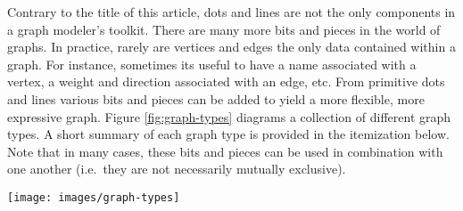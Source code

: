 \documentclass{svmult}
\begin{document}
Contrary to the title of this article, dots and lines are not the only components in a graph modeler's toolkit. There are many more bits and pieces in the world of graphs. In practice, rarely are vertices and edges the only data contained within a graph. For instance, sometimes its useful to have a name associated with a vertex, a weight and direction associated with an edge, etc. From primitive dots and lines various bits and pieces can be added to yield a more flexible, more expressive graph. Figure \ref{fig:graph-types} diagrams a collection of different graph types. A short summary of each graph type is provided in the itemization below. Note that in many cases, these bits and pieces can be used in combination with one another (i.e.~they are not necessarily mutually exclusive).
\begin{figure*}[h!]
	\centering
		\texttt{[image: images/graph-types]}
	\caption{\label{fig:graph-types}There are numerous types of graphs. Many of the formalisms described can be mixed and matched in order to provide the modeler the expressivity necessary to capture the essential features of a domain.}
\end{figure*}
\end{document}
